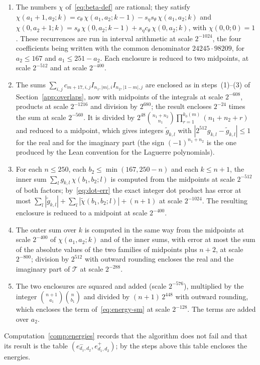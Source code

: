 \documentclass[11pt,reqno]{amsart}
\theoremstyle{definition}
\numberwithin{equation}{section}
\begin{document}
\begin{enumerate}
  \item The numbers $\chi$ of~\eqref{eq:beta-def} are rational; they satisfy $\chi(a_1+1,a_2;k)=c_\theta\,\chi(a_1,a_2;k-1)-s_\eta s_\theta\,\chi(a_1,a_2;k)$ and $\chi(0,a_2+1;k)=s_\theta\,\chi(0,a_2;k-1)+s_\eta c_\theta\,\chi(0,a_2;k)$, with $\chi(0,0;0)=1$. These recurrences are run in interval arithmetic at scale $2^{-1024}$, the four coefficients being written with the common denominator $24245\cdot98209$, for $a_2\le167$ and $a_1\le251-a_2$. Each enclosure is reduced to two midpoints, at scale $2^{-512}$ and at scale $2^{-400}$.
  \item The sums $\sum_{i,j}c_{m+17,i,j}I_{n_1,|m|,i}I_{n_2,|1-m|,j}$ are enclosed as in steps~(1)--(3) of Section~\ref{app:overlaps}, now with midpoints of the integrals at scale $2^{-608}$, products at scale $2^{-1216}$ and division by $2^{680}$; the result encloses $2^{-24}$ times the sum at scale $2^{-560}$. It is divided by $2^{48}\binom{n_1+n_2}{n_1}\prod_{r=1}^{k_0(m)}(n_1+n_2+r)$ and reduced to a midpoint, which gives integers $\tilde g_{k,l}$ with $|2^{512}g_{k,l}-\tilde g_{k,l}|\le1$ for the real and for the imaginary part (the sign $(-1)^{n_1+n_2}$ is the one produced by the Lean convention for the Laguerre polynomials).
  \item For each $n\le250$, each $b_2\le\min(167,250-n)$ and each $k\le n+1$, the inner sum $\sum_{l}g_{k,l}\,\chi(b_1,b_2;l)$ is computed from the midpoints at scale $2^{-512}$ of both factors; by~\eqref{eq:dot-err} the exact integer dot product has error at most $\sum_l|\tilde g_{k,l}|+\sum_l|\tilde\chi(b_1,b_2;l)|+(n+1)$ at scale $2^{-1024}$. The resulting enclosure is reduced to a midpoint at scale $2^{-400}$.
  \item The outer sum over $k$ is computed in the same way from the midpoints at scale $2^{-400}$ of $\chi(a_1,a_2;k)$ and of the inner sums, with error at most the sum of the absolute values of the two families of midpoints plus $n+2$, at scale $2^{-800}$; division by $2^{512}$ with outward rounding encloses the real and the imaginary part of $\mathcal{T}$ at scale $2^{-288}$.
  \item The two enclosures are squared and added (scale $2^{-576}$), multiplied by the integer $\binom{n+1}{a_1}\binom{n}{b_1}$ and divided by $(n+1)\,2^{448}$ with outward rounding, which encloses the term of~\eqref{eq:energy-sm} at scale $2^{-128}$. The terms are added over $a_2$.
\end{enumerate}
Computation~\ref{comp:energies} records that the algorithm does not fail and that its result is the table $(e^-_{d_1,d_2},e^+_{d_1,d_2})$; by the steps above this table encloses the energies.
\end{document}

